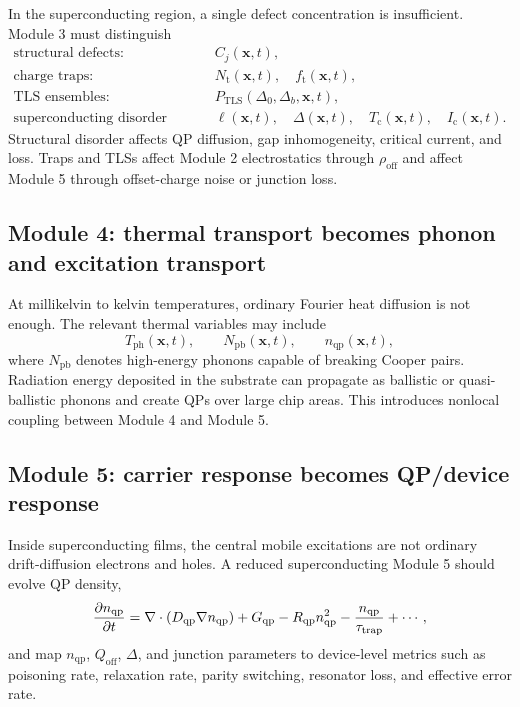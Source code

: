 \documentclass[11pt]{article}
\newcommand{\x}{\bm{x}}
\newcommand{\Qoff}{Q_{\mathrm{off}}}
\newcommand{\rhooff}{\rho_{\mathrm{off}}}
\newcommand{\Cj}{C_j}
\newcommand{\Nt}{N_{\mathrm{t}}}
\newcommand{\ft}{f_{\mathrm{t}}}
\newcommand{\TLS}{\mathrm{TLS}}
\newcommand{\Tph}{T_{\mathrm{ph}}}
\newcommand{\Npb}{N_{\mathrm{pb}}}
\newcommand{\DeltaSC}{\Delta}
\newcommand{\Tc}{T_{\mathrm{c}}}
\newcommand{\nqp}{n_{\mathrm{qp}}}
\newcommand{\Dqp}{D_{\mathrm{qp}}}
\newcommand{\Gqp}{G_{\mathrm{qp}}}
\newcommand{\Rqp}{R_{\mathrm{qp}}}
\newcommand{\tautrap}{\tau_{\mathrm{trap}}}
\newcommand{\Ic}{I_{\mathrm{c}}}
\begin{document}
In the superconducting region, a single defect concentration is insufficient. Module 3 must distinguish
\begin{align}
\text{structural defects:}&\qquad \Cj(\x,t),\\
\text{charge traps:}&\qquad \Nt(\x,t),\quad \ft(\x,t),\\
\text{TLS ensembles:}&\qquad P_{\TLS}(\Delta_0,\Delta_b,\x,t),\\
\text{superconducting disorder fields:}&\qquad \ell(\x,t),\quad \DeltaSC(\x,t),\quad \Tc(\x,t),\quad \Ic(\x,t).
\end{align}
Structural disorder affects QP diffusion, gap inhomogeneity, critical current, and loss. Traps and TLSs affect Module 2 electrostatics through \(\rhooff\) and affect Module 5 through offset-charge noise or junction loss.

\subsection{Module 4: thermal transport becomes phonon and excitation transport}

At millikelvin to kelvin temperatures, ordinary Fourier heat diffusion is not enough. The relevant thermal variables may include
\begin{equation}
\Tph(\x,t),\qquad \Npb(\x,t),\qquad \nqp(\x,t),
\end{equation}
where \(\Npb\) denotes high-energy phonons capable of breaking Cooper pairs. Radiation energy deposited in the substrate can propagate as ballistic or quasi-ballistic phonons and create QPs over large chip areas. This introduces nonlocal coupling between Module 4 and Module 5.

\subsection{Module 5: carrier response becomes QP/device response}

Inside superconducting films, the central mobile excitations are not ordinary drift-diffusion electrons and holes. A reduced superconducting Module 5 should evolve QP density,
\begin{equation}
\pdv{\nqp}{t}=\nabla\cdot(\Dqp\nabla\nqp)+\Gqp-\Rqp\nqp^2-\frac{\nqp}{\tautrap}+\cdots,
\end{equation}
and map \(\nqp\), \(\Qoff\), \(\DeltaSC\), and junction parameters to device-level metrics such as poisoning rate, relaxation rate, parity switching, resonator loss, and effective error rate.
\end{document}

